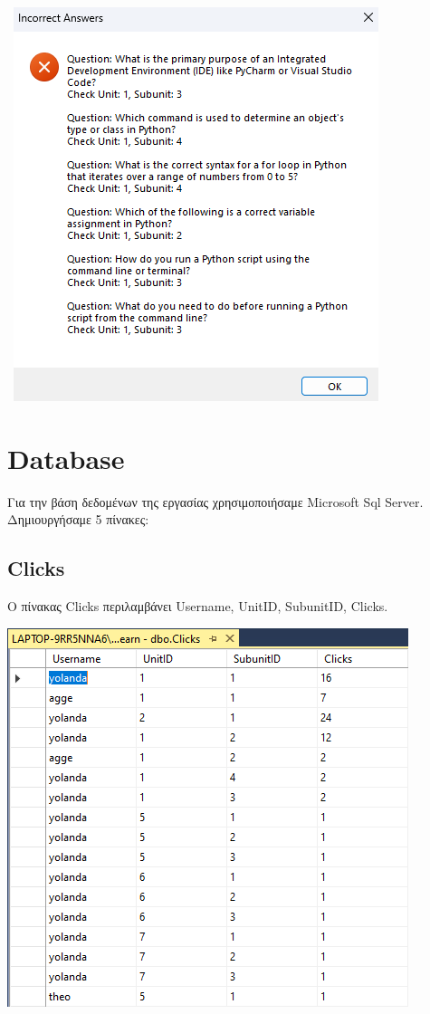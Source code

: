 \documentclass[12pt]{article}
\newcommand{\en}[1]{\foreignlanguage{English}{#1}}
\begin{document}
\begin{center}
    \
    \includegraphics[width=0.8\linewidth]{mistakes.png}
\end{center}
\newpage
\section*{\en{Database}}

Για την βάση δεδομένων της εργασίας χρησιμοποιήσαμε \en{Microsoft Sql Server}.
Δημιουργήσαμε 5 πίνακες:

\subsection*{\en{Clicks}}

Ο πίνακας \en{Clicks} περιλαμβάνει \en{Username, UnitID, SubunitID, Clicks}.

\begin{center}
    
    \includegraphics[width=0.7\linewidth]{clicksdb.png}
\end{center}
\end{document}
